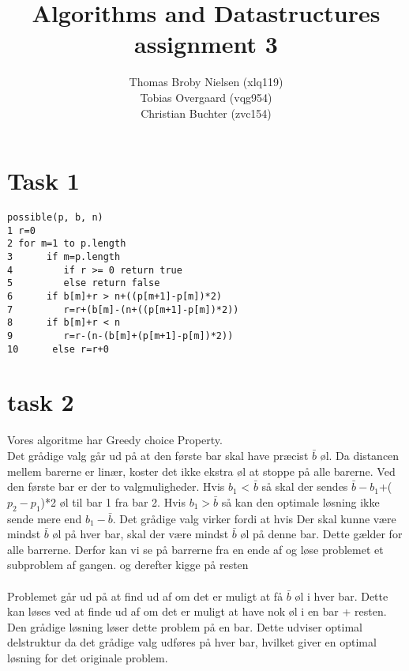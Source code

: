 \documentclass[12pt]{article}
\title{Algorithms and Datastructures assignment 3}
\author{Thomas Broby Nielsen (xlq119)\\ Tobias Overgaard (vqg954)\\ Christian Buchter (zvc154)}
\begin{document}
\maketitle

\tableofcontents

\pagebreak
\section{Task 1}
\begin{verbatim}
possible(p, b, n)
1 r=0
2 for m=1 to p.length
3      if m=p.length
4         if r >= 0 return true
5         else return false
6      if b[m]+r > n+((p[m+1]-p[m])*2)
7         r=r+(b[m]-(n+((p[m+1]-p[m])*2))
8      if b[m]+r < n
9         r=r-(n-(b[m]+(p[m+1]-p[m])*2))
10      else r=r+0

\end{verbatim}
\newpage
\section{task 2}

Vores algoritme har Greedy choice Property.\\
Det grådige valg går ud på at den første bar skal have præcist  $\bar{b}$ øl. Da distancen mellem barerne er linær, koster det ikke ekstra øl at stoppe på alle barerne. Ved den første bar er der to valgmuligheder. Hvis $b_1$ <  $\bar{b}$ så skal der sendes  $\bar{b}-$$b_1$+($p_2-p_1$)*2 øl til bar 1 fra bar 2. Hvis $b_1 >  \bar{b}$ så kan den optimale løsning ikke sende mere end $b_1- \bar{b}$. Det grådige valg virker fordi at hvis Der skal kunne være mindst $\bar{b}$ øl på hver bar, skal der være mindst $\bar{b}$ øl på denne bar. Dette gælder for alle barrerne. Derfor kan vi se på barrerne fra en ende af og løse problemet et subproblem af gangen. og derefter kigge på resten\\\\
Problemet går ud på at find ud af om det er muligt at få $\bar{b}$ øl i hver bar. Dette kan løses ved at finde ud af om det er muligt at have nok øl i en bar + resten. Den grådige løsning løser dette problem på en bar. Dette udviser optimal delstruktur da det grådige valg udføres på hver bar, hvilket giver en optimal løsning for det originale problem.

\newpage
\end{document}
